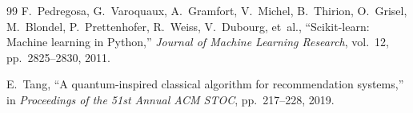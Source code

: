 \documentclass[journal,twocolumn]{IEEEtran}
\begin{document}
\begin{thebibliography}{99}
F.~Pedregosa, G.~Varoquaux, A.~Gramfort, V.~Michel, B.~Thirion, O.~Grisel, M.~Blondel, P.~Prettenhofer, R.~Weiss, V.~Dubourg, et~al.,
``Scikit-learn: Machine learning in Python,''
\emph{Journal of Machine Learning Research}, vol.~12, pp.~2825--2830, 2011.

E.~Tang,
``A quantum-inspired classical algorithm for recommendation systems,''
in \emph{Proceedings of the 51st Annual ACM STOC}, pp.~217--228, 2019.

\end{thebibliography}
\end{document}
